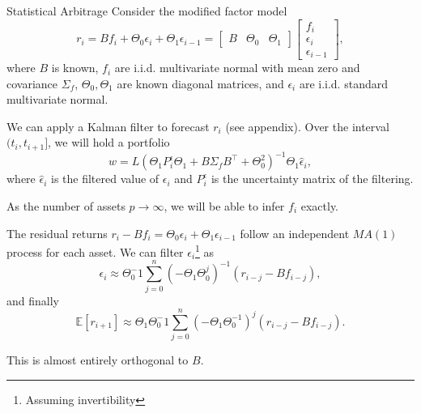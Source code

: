 \documentclass{beamer}
\begin{document}
\begin{frame}{Statistical Arbitrage}
	Consider the modified factor model
	$$r_i = Bf_i + \Theta_0\epsilon_i + \Theta_1\epsilon_{i-1} = \left[\begin{matrix}B & \Theta_0 & \Theta_1\end{matrix}\right]\left[\begin{matrix}f_i \\ \epsilon_i \\ \epsilon_{i-1}\end{matrix}\right],$$
	where $B$ is known, $f_i$ are i.i.d. multivariate normal with mean zero and covariance $\Sigma_f$, $\Theta_0,\Theta_1$ are known diagonal matrices, and $\epsilon_i$ are i.i.d. standard multivariate normal.

	We can apply a Kalman filter to forecast $r_i$ (see appendix). Over the interval $(t_i,t_{i+1}]$, we will hold a portfolio
	$$w = L(\Theta_1 P^\epsilon_i \Theta_1 + B\Sigma_f B^\top + \Theta_0^2)^{-1} \Theta_1\hat{\epsilon}_i,$$
	where $\hat{\epsilon}_i$ is the filtered value of $\epsilon_i$ and $P^\epsilon_i$ is the uncertainty matrix of the filtering.

	As the number of assets $p\to\infty$, we will be able to infer $f_i$ exactly.

	The residual returns $r_i-Bf_i = \Theta_0\epsilon_i + \Theta_1 \epsilon_{i-1}$ follow an independent $MA(1)$ process for each asset. We can filter $\epsilon_i$\footnote{Assuming invertibility} as
	$$\epsilon_i \approx \Theta_0^-1 \sum_{j=0}^n \left(-\Theta_1\Theta_0^j\right)^{-1}(r_{i-j}-Bf_{i-j}),$$
	and finally
	$$\mathbb{E}[r_{i+1}] \approx \Theta_1\Theta_0^-1 \sum_{j=0}^n \left(-\Theta_1\Theta_0^{-1}\right)^j(r_{i-j}-Bf_{i-j}).$$

	This is almost entirely orthogonal to $B$.
\end{frame}



\end{document}
